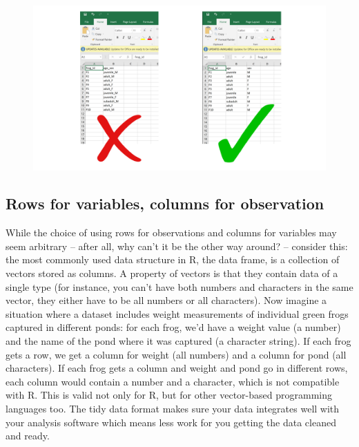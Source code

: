 \documentclass[
]{book}
\begin{document}
\begin{figure}

{\centering \includegraphics[width=1\linewidth]{img/spreadsheets_01} 

}

\caption{ }\label{fig:ss1}
\end{figure}

\hypertarget{rows-for-variables-columns-for-observation}{%
\subsection{Rows for variables, columns for observation}\label{rows-for-variables-columns-for-observation}}

While the choice of using rows for observations and columns for variables may seem arbitrary -- after all, why can't it be the other way around? -- consider this: the most commonly used data structure in R, the data frame, is a collection of vectors stored as columns. A property of vectors is that they contain data of a single type (for instance, you can't have both numbers and characters in the same vector, they either have to be all numbers or all characters). Now imagine a situation where a dataset includes weight measurements of individual green frogs captured in different ponds: for each frog, we'd have a weight value (a number) and the name of the pond where it was captured (a character string). If each frog gets a row, we get a column for weight (all numbers) and a column for pond (all characters). If each frog gets a column and weight and pond go in different rows, each column would contain a number and a character, which is not compatible with R. This is valid not only for R, but for other vector-based programming languages too. The tidy data format makes sure your data integrates well with your analysis software which means less work for you getting the data cleaned and ready.
\end{document}
